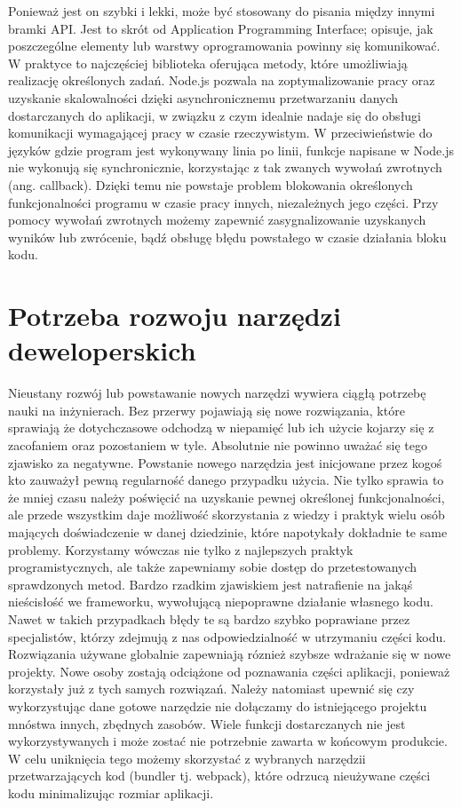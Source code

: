 \documentclass[12pt]{report}
\begin{document}
    Ponieważ jest on szybki i lekki, może być stosowany do pisania między innymi bramki API.
    Jest to skrót od Application Programming Interface; opisuje, jak poszczególne elementy lub warstwy oprogramowania powinny się komunikować.
    W praktyce to najczęściej biblioteka oferująca metody, które umożliwiają realizację określonych zadań.
    Node.js pozwala na zoptymalizowanie pracy oraz uzyskanie skalowalności dzięki asynchronicznemu przetwarzaniu danych dostarczanych do aplikacji, w związku z czym idealnie nadaje się do obsługi komunikacji wymagającej pracy w czasie rzeczywistym.
    W przeciwieństwie do języków gdzie program jest wykonywany linia po linii, funkcje napisane w Node.js nie wykonują się synchronicznie, korzystając z tak zwanych wywołań zwrotnych (ang. callback).
    Dzięki temu nie powstaje problem blokowania określonych funkcjonalności programu w czasie pracy innych, niezależnych jego części.
    Przy pomocy wywołań zwrotnych możemy zapewnić zasygnalizowanie uzyskanych wyników lub zwrócenie, bądź obsługę błędu powstałego w czasie działania bloku kodu.

  \section{Potrzeba rozwoju narzędzi deweloperskich}
    Nieustany rozwój lub powstawanie nowych narzędzi wywiera ciągłą potrzebę nauki na inżynierach.
    Bez przerwy pojawiają się nowe rozwiązania, które sprawiają że dotychczasowe odchodzą w niepamięć lub ich użycie kojarzy się z zacofaniem oraz pozostaniem w tyle.
    Absolutnie nie powinno uważać się tego zjawisko za negatywne.
    Powstanie nowego narzędzia jest inicjowane przez kogoś kto zauważył pewną regularność danego przypadku użycia.
    Nie tylko sprawia to że mniej czasu należy poświęcić na uzyskanie pewnej określonej funkcjonalności, ale przede wszystkim daje możliwość skorzystania z wiedzy i praktyk wielu osób mających doświadczenie w danej dziedzinie, które napotykały dokładnie te same problemy.
    Korzystamy wówczas nie tylko z najlepszych praktyk programistycznych, ale także zapewniamy sobie dostęp do przetestowanych sprawdzonych metod.
    Bardzo rzadkim zjawiskiem jest natrafienie na jakąś nieścisłość we frameworku, wywołującą niepoprawne działanie własnego kodu.
    Nawet w takich przypadkach błędy te są bardzo szybko poprawiane przez specjalistów, którzy zdejmują z nas odpowiedzialność w utrzymaniu części kodu.
    Rozwiązania używane globalnie zapewniają róznież szybsze wdrażanie się w nowe projekty.
    Nowe osoby zostają odciążone od poznawania części aplikacji, ponieważ korzystały już z tych samych rozwiązań.
    Należy natomiast upewnić się czy wykorzystując dane gotowe narzędzie nie dołączamy do istniejącego projektu mnóstwa innych, zbędnych zasobów.
    Wiele funkcji dostarczanych nie jest wykorzystywanych i może zostać nie potrzebnie zawarta w końcowym produkcie.
    W celu uniknięcia tego możemy skorzystać z wybranych narzędzii przetwarzających kod (bundler tj. webpack), które odrzucą nieużywane części kodu minimalizując rozmiar aplikacji.
\end{document}
